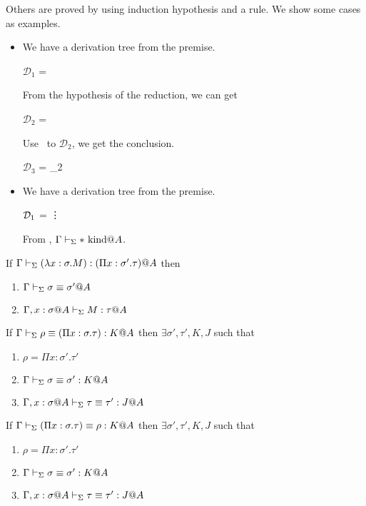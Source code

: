 Others are proved by using induction hypothesis and a rule. We show some cases as examples.
\begin{itemize}
	\item \KCsp

	      We have a derivation tree from the premise.

	      $\mathcal{D}_1$ = 
	      {}

	      From the hypothesis of the reduction, we can get

	      $\mathcal{D}_2$ = 

	      Use \WCsp\ to $\mathcal{D}_2$, we get the conclusion.

	      $\mathcal{D}_3$ = 
	      {_2}

	\item \KTW

	      We have a derivation tree from the premise.

	      $\mathcal{D}_1$ = 
	      {\vdots}

	      From \WStar, $\Gamma\vdash_\Sigma * \text{\ kind} @A$.

\end{itemize}

\begin{lemma}
	If $\Gamma \vdash_\Sigma (\lambda x:\sigma.M) : (\Pi x:\sigma'.\tau)@A$ then
	\begin{enumerate}
		\item $\Gamma \vdash_\Sigma \sigma \equiv \sigma'@A$
		\item $\G ,x:\sigma@A\V M:\tau@A$
	\end{enumerate}
	\item If $\Gamma \vdash_\Sigma \rho \equiv (\Pi x:\sigma.\tau) : K @A$ then $\exists \sigma', \tau', K, J$ such that
	\begin{enumerate}
		\item $\rho = \Pi x:\sigma'.\tau'$
		\item $\Gamma \vdash_\Sigma \sigma \equiv \sigma' : K @A$
		\item $\G, x:\sigma@A\V \tau \E \tau' : J @A$
	\end{enumerate}
	\item If $\Gamma \vdash_\Sigma (\Pi x:\sigma.\tau) \equiv \rho : K @A$ then $\exists \sigma', \tau', K, J$ such that
	\begin{enumerate}
		\item $\rho = \Pi x:\sigma'.\tau'$
		\item $\Gamma \vdash_\Sigma \sigma \equiv \sigma' : K @A$
		\item $\G, x:\sigma@A\V \tau \E \tau' : J @A$
	\end{enumerate}
\end{lemma}

